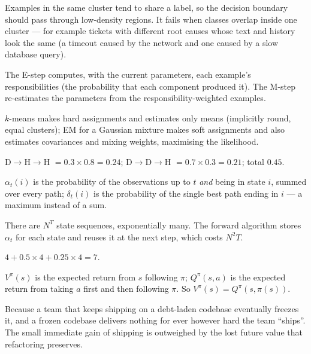 \begin{ans}
  \item Examples in the same cluster tend to share a label, so the decision boundary
        should pass through low-density regions. It fails when classes overlap inside
        one cluster --- for example tickets with different root causes whose text and
        history look the same (a timeout caused by the network and one caused by a
        slow database query).
  \item The E-step computes, with the current parameters, each example's
        responsibilities (the probability that each component produced it). The M-step
        re-estimates the parameters from the responsibility-weighted examples.
  \item $k$-means makes hard assignments and estimates only means (implicitly round,
        equal clusters); EM for a Gaussian mixture makes soft assignments and also
        estimates covariances and mixing weights, maximising the likelihood.
\end{ans}

\begin{ans}
  \item D$\to$H$\to$H $= 0.3 \times 0.8 = 0.24$; D$\to$D$\to$H $= 0.7 \times 0.3 = 0.21$;
        total $0.45$.
  \item $\alpha_t(i)$ is the probability of the observations up to $t$ \emph{and} being
        in state $i$, summed over every path; $\delta_t(i)$ is the probability of the
        single best path ending in $i$ --- a maximum instead of a sum.
  \item There are $N^T$ state sequences, exponentially many. The forward algorithm
        stores $\alpha_t$ for each state and reuses it at the next step, which costs
        $N^2 T$.
\end{ans}

\begin{ans}
  \item $4 + 0.5 \times 4 + 0.25 \times 4 = 7$.
  \item $V^{\pi}(s)$ is the expected return from $s$ following $\pi$; $Q^{\pi}(s, a)$ is the
        expected return from taking $a$ first and then following $\pi$. So
        $V^{\pi}(s) = Q^{\pi}(s, \pi(s))$.
  \item Because a team that keeps shipping on a debt-laden codebase eventually freezes
        it, and a frozen codebase delivers nothing for ever however hard the team
        ``ships''. The small immediate gain of shipping is outweighed by the lost future
        value that refactoring preserves.
\end{ans}


